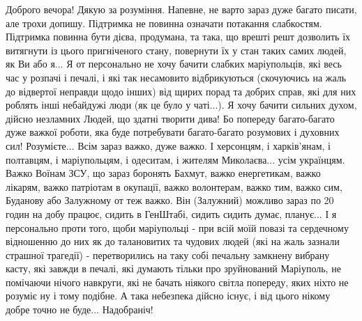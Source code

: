 Доброго вечора! Дякую за розуміння. Напевне, не варто зараз дуже багато писати,
але трохи допишу. Підтримка не повинна означати потакання слабкостям. Підтримка
повинна бути дієва, продумана, та така, що врешті решт дозволить їх витягнути
із цього пригніченого стану, повернути їх у стан таких самих людей, як Ви або
я... Я от персонально не хочу бачити слабких маріупольців, які весь час у
розпачі і печалі, і які так несамовито відбрикуються (скочуючись на жаль до
відвертої неправди щодо інших) від щирих порад та добрих справ, які для них
роблять інші небайдужі люди (як це було у чаті...). Я хочу бачити сильних
духом, дійсно незламних Людей, що здатні творити дива! Бо попереду
багато-багато дуже важкої роботи, яка буде потребувати багато-багато розумових
і духовних сил! Розумієте... Всім зараз важко, дуже важко. І херсонцям, і
харків'янам, і полтавцям, і маріупольцям, і одеситам, і жителям Миколаєва...
усім українцям. Важко Воїнам ЗСУ, що зараз боронять Бахмут, важко енергетикам,
важко лікарям, важко патріотам в окупації, важко волонтерам, важко тим, важко
сим, Буданову або Залужному от теж важко. Він (Залужний) можливо зараз по 20
годин на добу працює, сидить в ГенШтабі, сидить сидить думає, планує... І я
персонально проти того, щоби маріупольці - при всій моїй повазі та сердечному
відношенню до них як до талановитих та чудових людей (які на жаль зазнали
страшної трагедії) - перетворились на таку собі печальну замкнену вибрану
касту, які завжди в печалі, які думають тільки про зруйнований Маріуполь, не
помічаючи нічого навкруги, які не бачать ніякого світла попереду, яких ніхто не
розуміє ну і тому подібне. А така небезпека дійсно існує, і від цього нікому
добре точно не буде... Надобраніч!

